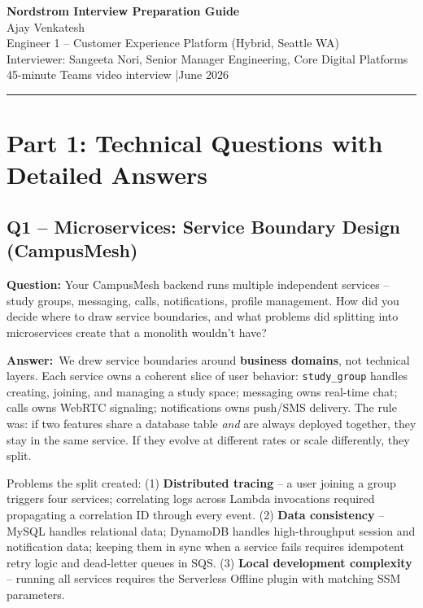 \documentclass[letterpaper,10pt]{article}
\newlength{\boxwidth}
\newcommand{\questionbox}[1]{%
  \vspace{6pt}%
  \noindent\colorbox{qbg}{%
    \begin{minipage}{\boxwidth}%
      \vspace{3pt}\textbf{\textcolor{nordblue}{Question:}} #1\vspace{3pt}%
    \end{minipage}%
  }\vspace{2pt}%
}
\newcommand{\answerlabel}{\noindent\textbf{\textcolor{answerblue}{Answer:}}~}
\begin{document}
\begin{center}
{\LARGE\bfseries\color{nordblue} Nordstrom Interview Preparation Guide}\\[6pt]
{\large Ajay Venkatesh}\\[4pt]
{\normalsize Engineer 1 -- Customer Experience Platform (Hybrid, Seattle WA)}\\
{\normalsize Interviewer: Sangeeta Nori, Senior Manager Engineering, Core Digital Platforms}\\[4pt]
{\small 45-minute Teams video interview \quad|\quad June 2026}
\end{center}
\vspace{4pt}\hrule\vspace{6pt}

\tableofcontents
\newpage

\section{Part 1: Technical Questions with Detailed Answers}

\subsection*{Q1 -- Microservices: Service Boundary Design (CampusMesh)}

\questionbox{Your CampusMesh backend runs multiple independent services -- study groups, messaging, calls, notifications, profile management. How did you decide where to draw service boundaries, and what problems did splitting into microservices create that a monolith wouldn't have?}

\answerlabel We drew service boundaries around \textbf{business domains}, not technical layers. Each service owns a coherent slice of user behavior: \texttt{study\_group} handles creating, joining, and managing a study space; messaging owns real-time chat; calls owns WebRTC signaling; notifications owns push/SMS delivery. The rule was: if two features share a database table \textit{and} are always deployed together, they stay in the same service. If they evolve at different rates or scale differently, they split.

Problems the split created: (1) \textbf{Distributed tracing} -- a user joining a group triggers four services; correlating logs across Lambda invocations required propagating a correlation ID through every event. (2) \textbf{Data consistency} -- MySQL handles relational data; DynamoDB handles high-throughput session and notification data; keeping them in sync when a service fails requires idempotent retry logic and dead-letter queues in SQS. (3) \textbf{Local development complexity} -- running all services requires the Serverless Offline plugin with matching SSM parameters.
\end{document}
